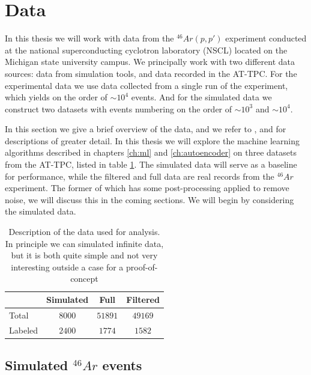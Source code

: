 \section{Data}\label{sec:data}

In this thesis we will work with data from the ${}^{46}Ar(p, p')$ experiment conducted at the national superconducting cyclotron laboratory (NSCL) located on the Michigan state university campus. We principally work with two different data sources: data from simulation tools, and data recorded in the AT-TPC. For the experimental data we use data collected from a single run of the experiment, which yields on the order of $\sim 10^4$ events.	And for the simulated data we construct two datasets with events numbering on the order of $\sim10^3$ and $\sim10^4$.

In this section we give a brief overview of the data, and we refer to \cite{Mittig2015}, \cite{Suzuki2012} and  \cite{Bradt2017a}  for descriptions of greater detail. In this thesis we will explore the machine learning algorithms described in chapters \ref{ch:ml} and \ref{ch:autoencoder} on three datasets from the AT-TPC, listed in table \ref{tab:datasets}. The simulated data will serve as a baseline for performance, while the filtered and full data are real records from the ${}^{46}Ar$ experiment. The former of which has some post-processing applied to remove noise, we will discuss this in the coming sections. We will begin by considering the simulated data.

\begin{table}[H]
\centering
\caption{Description of the data used for analysis. In principle we can simulated infinite data, but it is both quite simple and not very interesting outside a case for a proof-of-concept}\label{tab:datasets}
\begin{tabular}{lccc}
\toprule
{} & Simulated & Full & Filtered \\
\midrule
Total &  $8000$ & $51891$ & $49169$ \\
Labeled & $2400$ & $1774$ &  $1582$ \\ 
\bottomrule
\end{tabular}
\end{table}

\subsection{Simulated \texorpdfstring{${}^{46}Ar$}{46Ar}  events}\label{sec:data_sim}


